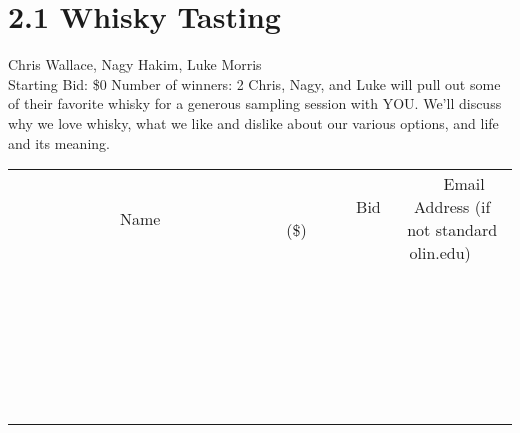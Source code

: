 \documentclass[11pt]{article}
\begin{document}
\section*{2.1 Whisky Tasting}
Chris Wallace, Nagy Hakim, Luke Morris
\\
Starting Bid: \$0
\newline
Number of winners: 2
\newline
Chris, Nagy, and Luke will pull out some of their favorite whisky for a generous sampling session with YOU. We'll discuss why we love whisky, what we like and dislike about our various options, and life and its meaning.
\\[6ex]
\begin{tabular}{c c c}
~~~~~~~~~~~~~Name~~~~~~~~~~~~~ & ~~~~~~~~~Bid (\$)~~~~~~~~~  & ~~~Email Address (if not standard olin.edu)~~~\\
 & & \\
\hline
 & & \\
\hline
 & & \\
\hline
 & & \\
\hline
 & & \\
\hline
 & & \\
\hline
 & & \\
\hline
 & & \\
\hline
 & & \\
\hline
 & & \\
\hline
 & & \\
\hline
 & & \\
\hline
 & & \\
\hline
 & & \\
\hline
 & & \\
\hline
 & & \\
\hline
 & & \\
\hline
 & & \\
\hline
 & & \\
\hline
 & & \\
\hline
 & & \\
\hline
 & & \\
\hline
 & & \\
\hline
 & & \\
\hline
 & & \\
\hline
 & & \\
\hline
\end{tabular}
\newpage
\end{document}
